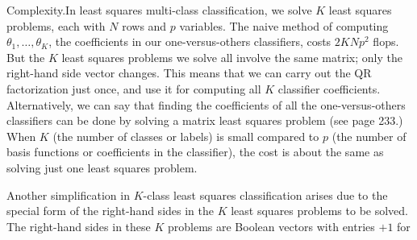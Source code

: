Complexity.In least squares multi-class classification, we solve \(K\) least squares problems, each with \(N\) rows and \(p\) variables. The naive method of computing \(\theta_{1},\ldots,\theta_{K}\), the coefficients in our one-versus-others classifiers, costs \(2KNp^{2}\) flops. But the \(K\) least squares problems we solve all involve the same matrix; only the right-hand side vector changes. This means that we can carry out the QR factorization just once, and use it for computing all \(K\) classifier coefficients. Alternatively, we can say that finding the coefficients of all the one-versus-others classifiers can be done by solving a matrix least squares problem (see page 233.) When \(K\) (the number of classes or labels) is small compared to \(p\) (the number of basis functions or coefficients in the classifier), the cost is about the same as solving just one least squares problem.

Another simplification in \(K\)-class least squares classification arises due to the special form of the right-hand sides in the \(K\) least squares problems to be solved. The right-hand sides in these \(K\) problems are Boolean vectors with entries \(+1\) for 